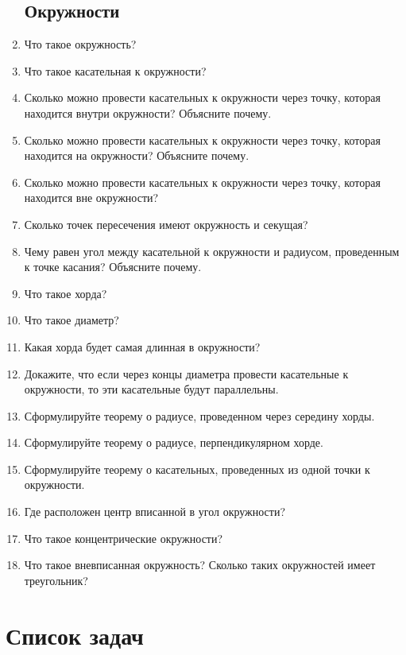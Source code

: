 \documentclass[12pt, a4paper]{article}
\begin{document}
\begin{enumerate}
	\subsection{Окружности}
	\item Что такое окружность?
	\item Что такое касательная к окружности?
	\item Сколько можно провести касательных к окружности через точку, которая находится внутри окружности? Объясните почему.
	\item Сколько можно провести касательных к окружности через точку, которая находится на окружности? Объясните почему.
	\item Сколько можно провести касательных к окружности через точку, которая находится вне окружности? 
	\item Сколько точек пересечения имеют окружность и секущая?
	\item Чему равен угол между касательной к окружности и радиусом, проведенным к точке касания? Объясните почему.
	\item Что такое хорда?
	\item Что такое диаметр?
	\item Какая хорда будет самая длинная в окружности?
	\item Докажите, что если через концы диаметра провести касательные к окружности, то эти касательные будут параллельны.
	\item Сформулируйте теорему о радиусе, проведенном через середину хорды.
	\item Сформулируйте теорему о радиусе, перпендикулярном хорде.
	\item Сформулируйте теорему о касательных, проведенных из одной точки к окружности.
	\item Где расположен центр вписанной в угол окружности?
	\item Что такое концентрические окружности?
	\item Что такое вневписанная окружность? Сколько таких окружностей имеет треугольник?
\end{enumerate}
\section{Список задач}
\end{document}
